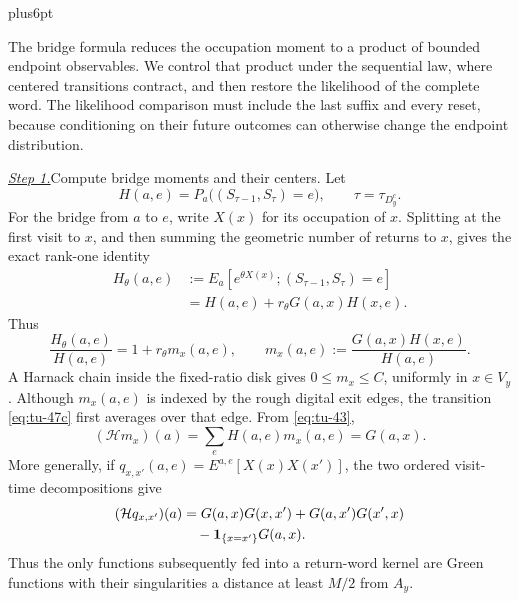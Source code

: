 \documentclass[12pt,reqno]{amsart}
\makeatletter
\theoremstyle{plain}
\theoremstyle{definition}
\theoremstyle{remark}
\renewenvironment{proof}[1][\proofname]{%
  \par
  \pushQED{\qed}%
  \normalfont
  \topsep6pt plus6pt\relax
  \trivlist
  \item[\hskip\labelsep\slshape #1\@addpunct{.}]%
  \ignorespaces
}{%
  \popQED
  \endtrivlist
  \@endpefalse
}
\DeclareRobustCommand{\qed}{%
  \leavevmode\unskip\penalty9999\hbox{}\nobreak
  \ifmmode
    \makebox[0pt][l]{\qquad\hbox{\qedsymbol}}%
  \else
    \qquad\hbox{\qedsymbol}%
  \fi
}
\renewcommand{\qedsymbol}{\rule[.47pt]{4pt}{6pt}}
\numberwithin{equation}{section}
\makeatother
\begin{document}
\begin{proof}[Proof of Lemma~\ref{lem:terminal-feynman-kac}]
The bridge formula reduces the occupation moment to a product of bounded
endpoint observables. We control that product under the sequential law,
where centered transitions contract, and then restore the likelihood of
the complete word. The likelihood comparison must include the last
suffix and every reset, because conditioning on their future outcomes
can otherwise change the endpoint distribution.

\smallskip\noindent
\underline{\textit{Step 1.}}\quad Compute bridge moments and their centers.
Let
\[
 H(a,e)=P_a\big((S_{\tau-1},S_\tau)=e\big),\qquad
 \tau=\tau_{D_y^c}.
\]
For the bridge from \(a\) to \(e\), write \(X(x)\) for its occupation of
\(x\).  Splitting at the first visit to \(x\), and then summing the
geometric number of returns to \(x\), gives the exact rank-one identity
\begin{equation}
\begin{split}
 H_\theta(a,e)
 &:=E_a[e^{\theta X(x)};(S_{\tau-1},S_\tau)=e]\\
 &=H(a,e)+r_\theta G(a,x)H(x,e).                              \end{split}
\label{eq:tu-42}
\end{equation}
Thus
\begin{equation}
       \frac{H_\theta(a,e)}{H(a,e)}
       =1+r_\theta m_x(a,e),\qquad
       m_x(a,e):=\frac{G(a,x)H(x,e)}{H(a,e)}.                 \label{eq:tu-43}
\end{equation}
A Harnack chain inside the fixed-ratio disk gives \(0\le m_x\le C\),
uniformly in \(x\in V_y\). Although \(m_x(a,e)\) is indexed by the
rough digital exit edges, the transition \eqref{eq:tu-47c} first averages over that
edge. From \eqref{eq:tu-43},
\begin{equation}
 (\mathcal{H}m_x)(a)=\sum_eH(a,e)m_x(a,e)=G(a,x).               \label{eq:tu-43a}
\end{equation}
More generally, if \(q_{x,x'}(a,e)=E^{a,e}[X(x)X(x')]\), the
two ordered visit-time decompositions give
\begin{equation}
\begin{split}
 (\mathcal{H}q_{x,x'})(a)
 &=G(a,x)G(x,x')+G(a,x')G(x',x)\\
 &\quad-{\bf1}_{\{x=x'\}}G(a,x).                            \end{split}
\label{eq:tu-43b}
\end{equation}
Thus the only functions subsequently fed into a return-word kernel are
Green functions with their singularities a distance at least \(M/2\)
from \(A_y\).


\end{proof}
\end{document}
